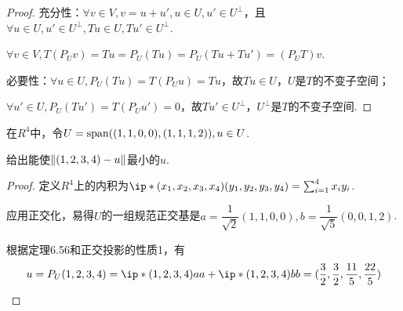 \begin{proof}
    充分性：\(\forall v \in V,v=u+u',u \in U,u' \in U^\bot\)，且\(\forall u \in U,u' \in U^\bot,Tu \in U,Tu' \in U^\bot\).

    \(\forall v \in V,T(P_U v)=Tu=P_U(Tu)=P_U(Tu+Tu')=(P_U T)v\).
    
    必要性：\(\forall u \in U,P_U(Tu)=T(P_U u)=Tu\)，故\(Tu \in U\)，\(U\)是\(T\)的不变子空间；
    
    \(\forall u' \in U,P_U(Tu')=T(P_U u')=0\)，故\(Tu' \in U^\bot\)，\(U^\bot\)是\(T\)的不变子空间.
\end{proof}

\begin{problem}[11]\label{6.C.11}
    在\(R^4\)中，令\(U=\altspan((1,1,0,0),(1,1,1,2)),u \in U\).
    
    给出能使\(\norm*{(1,2,3,4)-u}\)最小的\(u\).
\end{problem}

\begin{proof}
    定义\(R^4\)上的内积为\(\ip*{(x_1,x_2,x_3,x_4)}{(y_1,y_2,y_3,y_4)}=\sum_{i=1}^4 x_iy_i\).

    应用正交化，易得\(U\)的一组规范正交基是\(a=\dfrac{1}{\sqrt{2}}(1,1,0,0),b=\dfrac{1}{\sqrt{5}}(0,0,1,2)\).
    
    根据定理6.56和正交投影的性质1，有
    \begin{align*}
        u=P_U(1,2,3,4)=\ip*{(1,2,3,4)}{a}a+\ip*{(1,2,3,4)}{b}b 
        =(\dfrac{3}{2},\dfrac{3}{2},\dfrac{11}{5},\dfrac{22}{5})
    \end{align*}
\end{proof}

